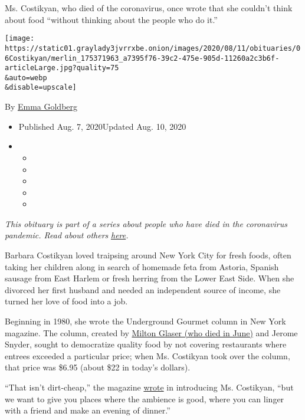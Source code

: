 Ms. Costikyan, who died of the coronavirus, once wrote that she couldn't
think about food ``without thinking about the people who do it.''

\texttt{[image: https://static01.graylady3jvrrxbe.onion/images/2020/08/11/obituaries/06Costikyan/merlin\_175371963\_a7395f76-39c2-475e-905d-11260a2c3b6f-articleLarge.jpg?quality=75\\\&auto=webp\\\&disable=upscale]}

By \href{https://www.nytimes3xbfgragh.onion/by/emma-goldberg}{Emma
Goldberg}

\begin{itemize}
\item
  Published Aug. 7, 2020Updated Aug. 10, 2020
\item
  \begin{itemize}
  \item
  \item
  \item
  \item
  \item
  \end{itemize}
\end{itemize}

\emph{This obituary is part of a series about people who have died in
the coronavirus pandemic. Read about others}
\href{https://www.nytimes3xbfgragh.onion/interactive/2020/obituaries/people-died-coronavirus-obituaries.html}{\emph{here}}\emph{.}

Barbara Costikyan loved traipsing around New York City for fresh foods,
often taking her children along in search of homemade feta from Astoria,
Spanish sausage from East Harlem or fresh herring from the Lower East
Side. When she divorced her first husband and needed an independent
source of income, she turned her love of food into a job.

Beginning in 1980, she wrote the Underground Gourmet column in New York
magazine. The column, created by
\href{https://www.nytimes3xbfgragh.onion/2020/06/26/obituaries/milton-glaser-dead.html}{Milton
Glaser (who died in June)} and Jerome Snyder, sought to democratize
quality food by not covering restaurants where entrees exceeded a
particular price; when Ms. Costikyan took over the column, that price
was \$6.95 (about \$22 in today's dollars).

``That isn't dirt-cheap,'' the magazine
\href{https://books.google.com/books?id=_OQCAAAAMBAJ\&pg=PA5\&lpg=PA5\&dq=\%E2\%80\%9Ccostikyan\%22\#v=onepage\&q=\%E2\%80\%9Ccostikyan\%22\&f=false}{wrote}
in introducing Ms. Costikyan, ``but we want to give you places where the
ambience is good, where you can linger with a friend and make an evening
of dinner.''


